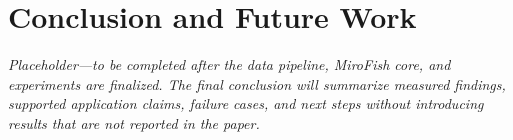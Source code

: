\documentclass[conference]{IEEEtran}
\begin{document}
\section{Conclusion and Future Work}

\emph{Placeholder---to be completed after the data pipeline, MiroFish core,
and experiments are finalized. The final conclusion will summarize measured
findings, supported application claims, failure cases, and next steps without
introducing results that are not reported in the paper.}



\end{document}
